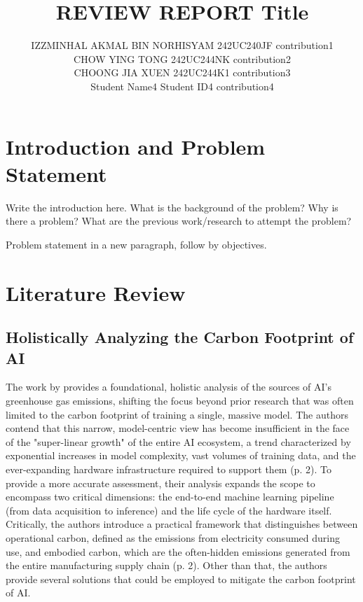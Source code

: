 \documentclass[a4paper, 12pt]{article}
\author{
IZZMINHAL AKMAL BIN NORHISYAM \quad 242UC240JF \quad contribution1 \\
CHOW YING TONG \quad 242UC244NK \quad contribution2\\
CHOONG JIA XUEN \quad 242UC244K1 \quad contribution3\\
Student Name4 \quad Student ID4 \quad contribution4\\
}
\title{ REVIEW REPORT  Title  }
\begin{document}
\maketitle


\section{Introduction and Problem Statement}
Write the introduction here. What is the background of the problem? Why is there a problem? What are the previous work/research to attempt the problem? 

Problem statement in a new paragraph, follow by objectives.

\section{Literature Review}
\subsection{Holistically Analyzing the Carbon Footprint of AI}
The work by \citet{Wu2022} provides a foundational, holistic analysis of the sources of AI's greenhouse gas emissions, shifting the focus beyond prior research that was often limited to the carbon footprint of training a single, massive model. The authors contend that this narrow, model-centric view has become insufficient in the face of the "super-linear growth" of the entire AI ecosystem, a trend characterized by exponential increases in model complexity, vast volumes of training data, and the ever-expanding hardware infrastructure required to support them (p. 2). To provide a more accurate assessment, their analysis expands the scope to encompass two critical dimensions: the end-to-end machine learning pipeline (from data acquisition to inference) and the life cycle of the hardware itself. Critically, the authors introduce a practical framework that distinguishes between operational carbon, defined as the emissions from electricity consumed during use, and embodied carbon, which are the often-hidden emissions generated from the entire manufacturing supply chain (p. 2). Other than that, the authors provide several solutions that could be employed to mitigate the carbon footprint of AI.
\end{document}

